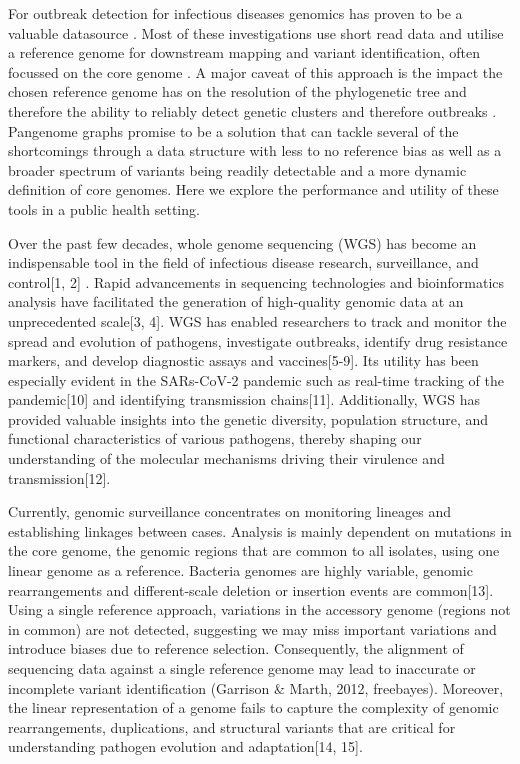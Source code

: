 For outbreak detection for infectious diseases genomics has proven to be a valuable datasource \citep{article}. Most of these investigations use short read data \citep{article} and utilise a reference genome for downstream mapping and variant identification, often focussed on the core genome \citep{article}. A major caveat of this approach is the impact the chosen reference genome has on the resolution of the phylogenetic tree and therefore the ability to reliably detect genetic clusters and therefore outbreaks \citep{article}. Pangenome graphs promise to be a solution that can tackle several of the shortcomings through a data structure with less to no reference bias as well as a broader spectrum of variants being readily detectable and a more dynamic definition of core genomes. Here we explore the performance and utility of these tools in a public health setting.

Over the past few decades, whole genome sequencing (WGS) has become an indispensable tool in the field of infectious disease research, surveillance, and control[1, 2] . Rapid advancements in sequencing technologies and bioinformatics analysis have facilitated the generation of high-quality genomic data at an unprecedented scale[3, 4]. WGS has enabled researchers to track and monitor the spread and evolution of pathogens, investigate outbreaks, identify drug resistance markers, and develop diagnostic assays and vaccines[5-9].  Its utility has been especially evident in the SARs-CoV-2 pandemic such as  real-time tracking of the pandemic[10] and identifying transmission chains[11]. Additionally, WGS has provided valuable insights into the genetic diversity, population structure, and functional characteristics of various pathogens, thereby shaping our understanding of the molecular mechanisms driving their virulence and transmission[12].

Currently, genomic surveillance concentrates on monitoring lineages and establishing linkages between cases. Analysis is mainly dependent on mutations in the core genome, the genomic regions that are common to all isolates, using one linear genome as a reference. Bacteria genomes are highly variable, genomic rearrangements and different-scale deletion or insertion events are common[13]. Using a single reference approach, variations in the accessory genome (regions not in common) are not detected, suggesting we may miss important variations and  introduce biases due to reference selection. Consequently, the alignment of sequencing data against a single reference genome may lead to inaccurate or incomplete variant identification (Garrison & Marth, 2012, freebayes). Moreover, the linear representation of a genome fails to capture the complexity of genomic rearrangements, duplications, and structural variants that are critical for understanding pathogen evolution and adaptation[14, 15]. 

